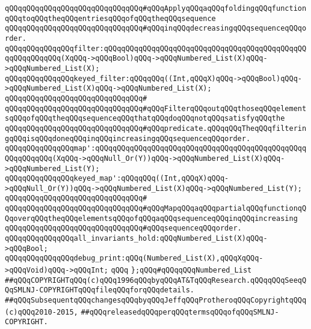 \verb|qQQqqQQqqQQqqQQqqQQqqQQqqQQqqQQq#qQQqApplyqQQqaqQQqfoldingqQQqfunctionqQQqtoqQQqtheqQQqentriesqQQqofqQQqtheqQQqsequence|\newline
\verb|qQQqqQQqqQQqqQQqqQQqqQQqqQQqqQQq#qQQqinqQQqdecreasingqQQqsequenceqQQqorder.|\newline
\newline
\verb|qQQqqQQqqQQqqQQqfilter:qQQqqQQqqQQqqQQqqQQqqQQqqQQqqQQqqQQqqQQqqQQqqQQqqQQqqQQqqQQq(XqQQq->qQQqBool)qQQq->qQQqNumbered_List(X)qQQq->qQQqNumbered_List(X);|\newline
\verb|qQQqqQQqqQQqqQQqkeyed_filter:qQQqqQQq((Int,qQQqX)qQQq->qQQqBool)qQQq->qQQqNumbered_List(X)qQQq->qQQqNumbered_List(X);|\newline
\verb|qQQqqQQqqQQqqQQqqQQqqQQqqQQqqQQq#|\newline
\verb|qQQqqQQqqQQqqQQqqQQqqQQqqQQqqQQq#qQQqFilterqQQqoutqQQqthoseqQQqelementsqQQqofqQQqtheqQQqsequenceqQQqthatqQQqdoqQQqnotqQQqsatisfyqQQqthe|\newline
\verb|qQQqqQQqqQQqqQQqqQQqqQQqqQQqqQQq#qQQqpredicate.qQQqqQQqTheqQQqfilteringqQQqisqQQqdoneqQQqinqQQqincreasingqQQqsequenceqQQqorder.|\newline
\newline
\verb|qQQqqQQqqQQqqQQqmap':qQQqqQQqqQQqqQQqqQQqqQQqqQQqqQQqqQQqqQQqqQQqqQQqqQQqqQQqqQQq(XqQQq->qQQqNull_Or(Y))qQQq->qQQqNumbered_List(X)qQQq->qQQqNumbered_List(Y);|\newline
\verb|qQQqqQQqqQQqqQQqkeyed_map':qQQqqQQq((Int,qQQqX)qQQq->qQQqNull_Or(Y))qQQq->qQQqNumbered_List(X)qQQq->qQQqNumbered_List(Y);|\newline
\verb|qQQqqQQqqQQqqQQqqQQqqQQqqQQqqQQq#|\newline
\verb|qQQqqQQqqQQqqQQqqQQqqQQqqQQqqQQq#qQQqMapqQQqaqQQqpartialqQQqfunctionqQQqoverqQQqtheqQQqelementsqQQqofqQQqaqQQqsequenceqQQqinqQQqincreasing|\newline
\verb|qQQqqQQqqQQqqQQqqQQqqQQqqQQqqQQq#qQQqsequenceqQQqorder.|\newline
\newline
\verb|qQQqqQQqqQQqqQQqall_invariants_hold:qQQqNumbered_List(X)qQQq->qQQqBool;|\newline
\newline
\verb|qQQqqQQqqQQqqQQqdebug_print:qQQq(Numbered_List(X),qQQqXqQQq->qQQqVoid)qQQq->qQQqInt;|\newline
\verb|qQQq|\newline
\verb|};qQQq#qQQqqQQqNumbered_List|\newline
\newline
\newline
\verb|##qQQqCOPYRIGHTqQQq(c)qQQq1996qQQqbyqQQqAT&TqQQqResearch.qQQqqQQqSeeqQQqSMLNJ-COPYRIGHTqQQqfileqQQqforqQQqdetails.|\newline
\verb|##qQQqSubsequentqQQqchangesqQQqbyqQQqJeffqQQqProtheroqQQqCopyrightqQQq(c)qQQq2010-2015,|\newline
\verb|##qQQqreleasedqQQqperqQQqtermsqQQqofqQQqSMLNJ-COPYRIGHT.|\newline

